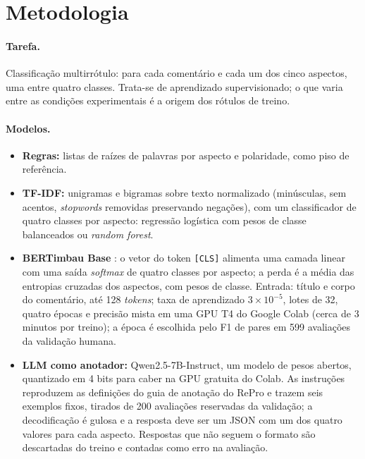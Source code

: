 \documentclass[a4paper, twocolumn, 11pt, twoside]{article}
\begin{document}
\section{Metodologia}

\paragraph{Tarefa.} Classificação multirrótulo: para cada comentário e cada um dos cinco aspectos, uma entre quatro classes. Trata-se de aprendizado supervisionado; o que varia entre as condições experimentais é a origem dos rótulos de treino.

\paragraph{Modelos.}
\begin{itemize}
  \item \textbf{Regras:} listas de raízes de palavras por aspecto e polaridade, como piso de referência.
  \item \textbf{TF-IDF:} unigramas e bigramas sobre texto normalizado (minúsculas, sem acentos, \emph{stopwords} removidas preservando negações), com um classificador de quatro classes por aspecto: regressão logística com pesos de classe balanceados ou \emph{random forest}.
  \item \textbf{BERTimbau Base} \citep{souza2020bertimbau}: o vetor do token \texttt{[CLS]} alimenta uma camada linear com uma saída \emph{softmax} de quatro classes por aspecto; a perda é a média das entropias cruzadas dos aspectos, com pesos de classe. Entrada: título e corpo do comentário, até 128 \emph{tokens}; taxa de aprendizado $3\times10^{-5}$, lotes de 32, quatro épocas e precisão mista em uma GPU T4 do Google Colab (cerca de 3 minutos por treino); a época é escolhida pelo F1 de pares em 599 avaliações da validação humana.
  \item \textbf{LLM como anotador:} Qwen2.5-7B-Instruct, um modelo de pesos abertos, quantizado em 4 bits para caber na GPU gratuita do Colab. As instruções reproduzem as definições do guia de anotação do RePro e trazem seis exemplos fixos, tirados de 200 avaliações reservadas da validação; a decodificação é gulosa e a resposta deve ser um JSON com um dos quatro valores para cada aspecto. Respostas que não seguem o formato são descartadas do treino e contadas como erro na avaliação.
\end{itemize}
\end{document}
